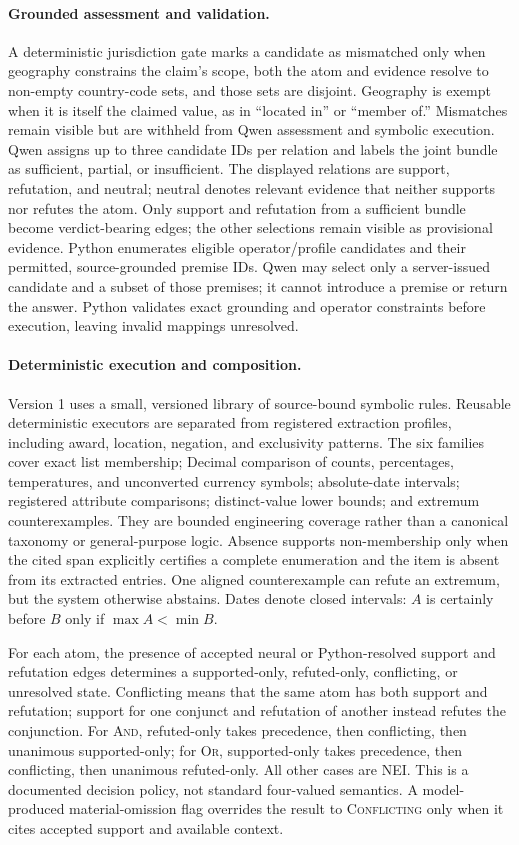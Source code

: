 \documentclass[letterpaper,twocolumn,10pt]{article}
\begin{document}
\paragraph{Grounded assessment and validation.}
A deterministic jurisdiction gate marks a candidate as mismatched only when
geography constrains the claim's scope, both the atom and evidence resolve to
non-empty country-code sets, and those sets are disjoint. Geography is exempt
when it is itself the claimed value, as in ``located in'' or ``member of.''
Mismatches remain visible but are withheld from Qwen assessment and symbolic
execution. Qwen assigns up to three candidate IDs per relation and labels the
joint bundle as sufficient, partial, or insufficient. The displayed relations
are support, refutation, and neutral; neutral denotes relevant evidence that
neither supports nor refutes the atom. Only support and
refutation from a sufficient bundle become verdict-bearing edges; the other
selections remain visible as provisional evidence.
Python enumerates eligible operator/profile candidates and their permitted,
source-grounded premise IDs. Qwen may select only a server-issued candidate and
a subset of those premises; it cannot introduce a premise or return the answer.
Python validates exact grounding and operator constraints before execution,
leaving invalid mappings unresolved.

\paragraph{Deterministic execution and composition.}
Version 1 uses a small, versioned library of source-bound symbolic rules.
Reusable deterministic executors are separated from registered extraction
profiles, including award, location, negation, and exclusivity patterns. The six
families cover exact list membership; Decimal comparison of counts,
percentages, temperatures, and unconverted currency symbols; absolute-date
intervals; registered attribute comparisons; distinct-value lower bounds; and
extremum counterexamples. They are bounded engineering coverage rather than a
canonical taxonomy or general-purpose logic. Absence supports
non-membership only when the cited span explicitly certifies a complete
enumeration and the item is absent from its extracted entries. One aligned
counterexample can refute an extremum, but the system otherwise abstains. Dates
denote closed intervals: $A$ is certainly before $B$ only if
$\max A<\min B$.

For each atom, the presence of accepted neural or Python-resolved support and
refutation edges determines a supported-only, refuted-only, conflicting, or
unresolved state. Conflicting means that the same atom has both support and
refutation; support for one conjunct and refutation of another instead refutes
the conjunction. For \textsc{And}, refuted-only takes precedence, then
conflicting, then unanimous supported-only; for \textsc{Or}, supported-only
takes precedence, then conflicting, then unanimous refuted-only. All other cases
are \textsc{NEI}. This is a documented decision policy, not standard four-valued
semantics. A model-produced material-omission flag overrides the result to
\textsc{Conflicting} only when it cites accepted support and available context.
\end{document}
